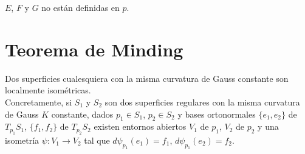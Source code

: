 \begin{remark}
    $E$, $F$ y $G$ no están definidas en $p$.
\end{remark}

\section{Teorema de Minding}

\begin{theorem}
    Dos superficies cualesquiera con la misma curvatura de Gauss constante son localmente isométricas.\\
    Concretamente, si $S_1$ y $S_2$ son dos superficies regulares con la misma curvatura de Gauss $K$ constante, dados $p_1 \in S_1$, $p_2 \in S_2$ y bases ortonormales $\{e_1,e_2\}$ de $T_{p_1}S_1$, $\{f_1,f_2\}$ de $T_{p_2}S_2$ existen entornos abiertos $V_1$ de $p_1$, $V_2$ de $p_2$ y una isometría $\psi : V_1 \to V_2$ tal que $d\psi_{p_1}(e_1) = f_1$, $d\psi_{p_1}(e_2) = f_2$.


\end{theorem}
